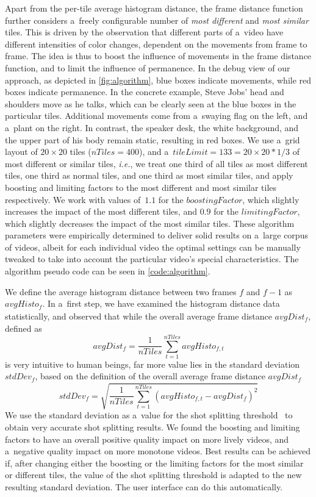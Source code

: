Apart from the per-tile average histogram distance,
the frame distance function further considers
a~freely configurable number of \emph{most different} and
\emph{most similar} tiles.
This is driven by the observation that different parts
of a~video have different intensities of color changes,
dependent on the movements from frame to frame.
The idea is thus to boost the influence of movements in the frame
distance function, and to limit the influence of permanence.
In the debug view of our approach, as depicted in
\autoref{fig:algorithm}, blue boxes indicate movements,
while red boxes indicate permanence.
In the concrete example, Steve Jobs' head and shoulders move
as he talks, which can be clearly seen
at the blue boxes in the particular tiles.
Additional movements come from a~swaying flag on the left,
and a~plant on the right.
In contrast, the speaker desk, the white background,
and the upper part of his body remain static,
resulting in red boxes.
We use a~grid layout of $\mathit{20} \times \mathit{20}$ tiles
($\mathit{nTiles} = \mathit{400}$), and
a~$\mathit{tileLimit = 133 = \mathit{20} \times \mathit{20} * 1/3}$
of most different or similar tiles,
\emph{i.e.}, we treat one third of all tiles
as most different tiles, one third as normal tiles,
and one third as most similar tiles,
and apply boosting and limiting factors to the most different
and most similar tiles respectively.
We work with values of~$\mathit{1.1}$ for the
$\mathit{boostingFactor}$, which slightly increases
the impact of the most different tiles,
and $\mathit{0.9}$ for the $\mathit{limitingFactor}$,
which slightly decreases the impact of the most similar tiles.
These algorithm parameters were empirically determined
to deliver solid results on a~large corpus of videos,
albeit for each individual video the optimal settings
can be manually tweaked to take into account the
particular video's special characteristics.
The algorithm pseudo code can be seen in \autoref{code:algorithm}.

We define the average histogram distance between two frames
$\mathit{f}$ and $\mathit{f - 1}$ as $\mathit{avgHisto_{f}}$.
In a~first step, we have examined the histogram distance
data statistically, and observed that while
the overall average frame distance $\mathit{avgDist_{f}}$,
defined as $$\mathit{avgDist_{f}} =
\frac{1}{\mathit{nTiles}}\sum_{t=1}^{\mathit{nTiles}}
\mathit{avgHisto_{f, t}}$$ is very intuitive to human beings,
far more value lies in the standard deviation
$\mathit{stdDev_{f}}$, based on the definition of the overall
average frame distance $\mathit{avgDist_{f}}$
$$\mathit{stdDev_{f}} =
\sqrt{\frac{1}{\mathit{nTiles}}\sum_{t=1}^{\mathit{nTiles}}
(\mathit{avgHisto_{f, t}} - \mathit{avgDist_{f}})^{2}}$$
We use the standard deviation as a~value for the shot splitting
threshold~\cite{lienhart1999comparison}
to obtain very accurate shot splitting results.
We found the boosting and limiting factors to have an overall
positive quality impact on more lively videos,
and a~negative quality impact on more monotone videos.
Best results can be achieved if,
after changing either the boosting or the limiting factors
for the most similar or different tiles,
the value of the shot splitting threshold is adapted
to the new resulting standard deviation.
The user interface can do this automatically.

